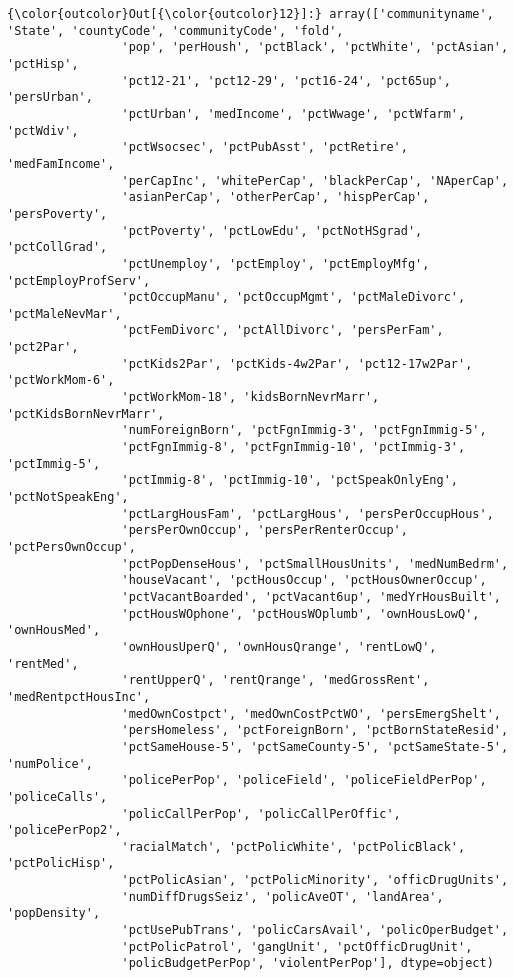 \documentclass[11pt]{llncs}
\begin{document}
\begin{Verbatim}[commandchars=\\\{\}]
{\color{outcolor}Out[{\color{outcolor}12}]:} array(['communityname', 'State', 'countyCode', 'communityCode', 'fold',
                'pop', 'perHoush', 'pctBlack', 'pctWhite', 'pctAsian', 'pctHisp',
                'pct12-21', 'pct12-29', 'pct16-24', 'pct65up', 'persUrban',
                'pctUrban', 'medIncome', 'pctWwage', 'pctWfarm', 'pctWdiv',
                'pctWsocsec', 'pctPubAsst', 'pctRetire', 'medFamIncome',
                'perCapInc', 'whitePerCap', 'blackPerCap', 'NAperCap',
                'asianPerCap', 'otherPerCap', 'hispPerCap', 'persPoverty',
                'pctPoverty', 'pctLowEdu', 'pctNotHSgrad', 'pctCollGrad',
                'pctUnemploy', 'pctEmploy', 'pctEmployMfg', 'pctEmployProfServ',
                'pctOccupManu', 'pctOccupMgmt', 'pctMaleDivorc', 'pctMaleNevMar',
                'pctFemDivorc', 'pctAllDivorc', 'persPerFam', 'pct2Par',
                'pctKids2Par', 'pctKids-4w2Par', 'pct12-17w2Par', 'pctWorkMom-6',
                'pctWorkMom-18', 'kidsBornNevrMarr', 'pctKidsBornNevrMarr',
                'numForeignBorn', 'pctFgnImmig-3', 'pctFgnImmig-5',
                'pctFgnImmig-8', 'pctFgnImmig-10', 'pctImmig-3', 'pctImmig-5',
                'pctImmig-8', 'pctImmig-10', 'pctSpeakOnlyEng', 'pctNotSpeakEng',
                'pctLargHousFam', 'pctLargHous', 'persPerOccupHous',
                'persPerOwnOccup', 'persPerRenterOccup', 'pctPersOwnOccup',
                'pctPopDenseHous', 'pctSmallHousUnits', 'medNumBedrm',
                'houseVacant', 'pctHousOccup', 'pctHousOwnerOccup',
                'pctVacantBoarded', 'pctVacant6up', 'medYrHousBuilt',
                'pctHousWOphone', 'pctHousWOplumb', 'ownHousLowQ', 'ownHousMed',
                'ownHousUperQ', 'ownHousQrange', 'rentLowQ', 'rentMed',
                'rentUpperQ', 'rentQrange', 'medGrossRent', 'medRentpctHousInc',
                'medOwnCostpct', 'medOwnCostPctWO', 'persEmergShelt',
                'persHomeless', 'pctForeignBorn', 'pctBornStateResid',
                'pctSameHouse-5', 'pctSameCounty-5', 'pctSameState-5', 'numPolice',
                'policePerPop', 'policeField', 'policeFieldPerPop', 'policeCalls',
                'policCallPerPop', 'policCallPerOffic', 'policePerPop2',
                'racialMatch', 'pctPolicWhite', 'pctPolicBlack', 'pctPolicHisp',
                'pctPolicAsian', 'pctPolicMinority', 'officDrugUnits',
                'numDiffDrugsSeiz', 'policAveOT', 'landArea', 'popDensity',
                'pctUsePubTrans', 'policCarsAvail', 'policOperBudget',
                'pctPolicPatrol', 'gangUnit', 'pctOfficDrugUnit',
                'policBudgetPerPop', 'violentPerPop'], dtype=object)
\end{Verbatim}
            
\end{document}
